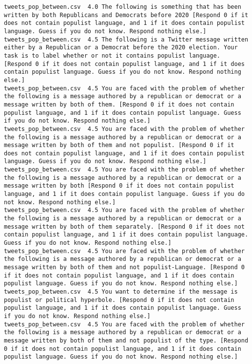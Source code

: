 \begin{lstlisting}[label=lst:promptvariants]
tweets_pop_between.csv	4.0	The following is something that has been written by both Republicans and Democrats before 2020 [Respond 0 if it does not contain populist language, and 1 if it does contain populist language. Guess if you do not know. Respond nothing else.]
tweets_pop_between.csv	4.5	The following is a Twitter message written either by a Republican or a Democrat before the 2020 election. Your task is to label whether or not it contains populist language. [Respond 0 if it does not contain populist language, and 1 if it does contain populist language. Guess if you do not know. Respond nothing else.]
tweets_pop_between.csv	4.5	You are faced with the problem of whether the following is a message authored by a republican or democrat or a message written by both of them. [Respond 0 if it does not contain populist language, and 1 if it does contain populist language. Guess if you do not know. Respond nothing else.]
tweets_pop_between.csv	4.5	You are faced with the problem of whether the following is a message authored by a republican or democrat or a message written by both of them and not populist. [Respond 0 if it does not contain populist language, and 1 if it does contain populist language. Guess if you do not know. Respond nothing else.]
tweets_pop_between.csv	4.5	You are faced with the problem of whether the following is a message authored by a republican or democrat or a message written by both [Respond 0 if it does not contain populist language, and 1 if it does contain populist language. Guess if you do not know. Respond nothing else.]
tweets_pop_between.csv	4.5	You are faced with the problem of whether the following is a message authored by a republican or democrat or a message written by both of them separately. [Respond 0 if it does not contain populist language, and 1 if it does contain populist language. Guess if you do not know. Respond nothing else.]
tweets_pop_between.csv	4.5	You are faced with the problem of whether the following is a message authored by a republican or democrat or a message written by both of them and not populist-Language. [Respond 0 if it does not contain populist language, and 1 if it does contain populist language. Guess if you do not know. Respond nothing else.]
tweets_pop_between.csv	4.5	You want to determine if the message is populist or political hyperbole. [Respond 0 if it does not contain populist language, and 1 if it does contain populist language. Guess if you do not know. Respond nothing else.]
tweets_pop_between.csv	4.5	You are faced with the problem of whether the following is a message authored by a republican or democrat or a message written by both of them and not populist of the type. [Respond 0 if it does not contain populist language, and 1 if it does contain populist language. Guess if you do not know. Respond nothing else.]

\end{lstlisting}
